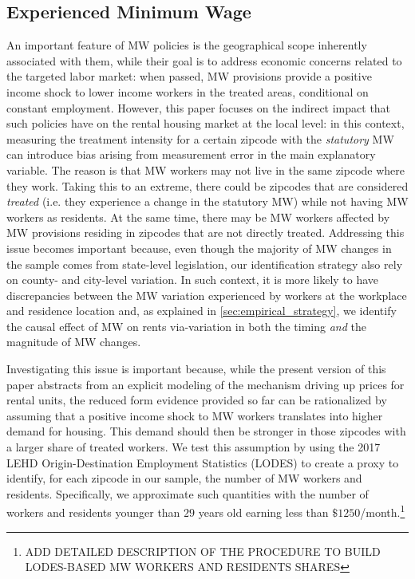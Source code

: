 \subsection{Experienced Minimum Wage}
An important feature of MW policies is the geographical scope inherently associated with them,
 while their goal is to address economic concerns related to the targeted labor market: when passed, 
 MW provisions provide a positive income shock to lower income workers in the treated areas, conditional 
 on constant employment. However, this paper focuses on the indirect impact that such policies have on 
 the rental housing market at the local level: in this context, measuring the treatment intensity for a certain 
 zipcode with the \textit{statutory} MW can introduce bias arising from measurement error in the main 
 explanatory variable. The reason is that MW workers may not live in the same zipcode where they work. 
 Taking this to an extreme, there could be zipcodes that are considered \textit{treated} (i.e. they experience a 
 change in the statutory MW) while not having MW workers as residents.  At the same time, there may be 
 MW workers affected by MW provisions residing in zipcodes that are not directly treated. Addressing this issue 
 becomes important because, even though the majority of MW changes in the sample comes from state-level 
 legislation, our identification strategy also rely on county- and city-level variation. In such context, it is more 
 likely to have discrepancies between the MW variation experienced by workers at the workplace and residence 
 location and, as explained in \autoref{sec:empirical_strategy}, we identify the causal effect of MW on 
 rents via-variation in both the timing \textit{and} the magnitude of MW changes. 
 
 Investigating this issue is important because, while the present version of this paper abstracts from an explicit modeling 
 of the mechanism driving up prices for rental units, the reduced form evidence provided so far can be rationalized by 
 assuming that a positive income shock to MW workers translates into higher demand for housing. This demand 
 should then be stronger in those zipcodes with a larger share of treated workers. We test this assumption by 
 using the 2017 LEHD Origin-Destination Employment Statistics (LODES) to create a proxy to identify, for each 
 zipcode in our sample, the number of MW workers and residents. Specifically, we approximate such quantities
 with the number of workers and residents younger than $29$ years old earning less than $\$1250$/month.\footnote{ADD 
 	DETAILED DESCRIPTION OF THE PROCEDURE TO BUILD LODES-BASED MW WORKERS AND RESIDENTS SHARES} 

